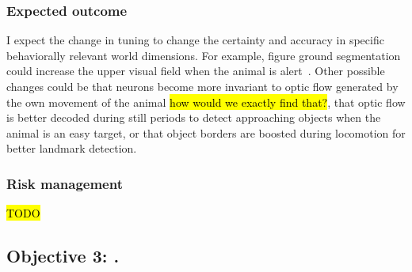 \documentclass[B2,COG]{ercgrant}
\begin{document}
\subsubsection{Expected outcome} 
I expect the change in tuning to change the certainty and accuracy in specific behaviorally relevant world dimensions. 
For example, figure ground segmentation could increase the upper visual field when the animal is alert~\parencite[similar to findings in ][]{Franke2022-do}.
Other possible changes could be that neurons become more invariant to optic flow generated by the own movement of the animal \hl{how would we exactly find that?}, that optic flow is better decoded during still periods to detect approaching objects when the animal is an easy target, or that object borders are boosted during locomotion for better landmark detection. 

\subsubsection{Risk management} 
\hl{TODO}



\subsection{\colorbox{obj3}{\color{white}Objective 3}: \othreetitle .}
\label{sub:obj3}
\end{document}
